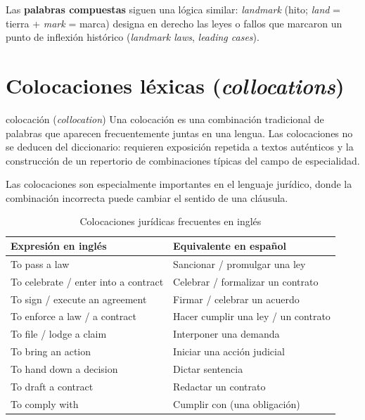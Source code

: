 \documentclass[12pt,oneside]{book}
\begin{document}
Las \textbf{palabras compuestas} siguen una lógica similar: \textit{landmark} (hito; \textit{land} = tierra + \textit{mark} = marca) designa en derecho las leyes o fallos que marcaron un punto de inflexión histórico (\textit{landmark laws}, \textit{leading cases}).

\section{Colocaciones léxicas (\textit{collocations})}

\begin{definition}{colocación (\textit{collocation})}
Una colocación es una combinación tradicional de palabras que aparecen frecuentemente juntas en una lengua. Las colocaciones no se deducen del diccionario: requieren exposición repetida a textos auténticos y la construcción de un repertorio de combinaciones típicas del campo de especialidad.
\end{definition}

Las colocaciones son especialmente importantes en el lenguaje jurídico, donde la combinación incorrecta puede cambiar el sentido de una cláusula.

\begin{table}[H]
\centering
\caption{Colocaciones jurídicas frecuentes en inglés}
\begin{tabularx}{\textwidth}{>{\raggedright\arraybackslash}p{} >{\raggedright\arraybackslash}X}
\toprule
\textbf{Expresión en inglés} & \textbf{Equivalente en español} \\
\midrule
To pass a law & Sancionar / promulgar una ley \\
To celebrate / enter into a contract & Celebrar / formalizar un contrato \\
To sign / execute an agreement & Firmar / celebrar un acuerdo \\
To enforce a law / a contract & Hacer cumplir una ley / un contrato \\
To file / lodge a claim & Interponer una demanda \\
To bring an action & Iniciar una acción judicial \\
To hand down a decision & Dictar sentencia \\
To draft a contract & Redactar un contrato \\
To comply with & Cumplir con (una obligación) \\
\bottomrule
\end{tabularx}
\end{table}
\end{document}
